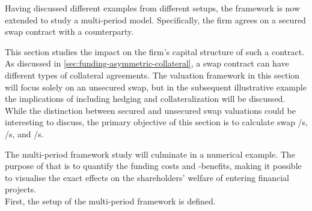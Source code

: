 \documentclass[main.tex]{subfiles}
\begin{document}
    Having discussed different examples from different setups,
    the framework is now extended to study a multi-period model.
    Specifically, the firm agrees on a secured swap contract with a counterparty.
    
    This section studies the impact on the firm's capital structure of such a contract.
    As discussed in \cref{sec:funding-asymmetric-collateral}, a swap contract can have different types of collateral agreements.
    The valuation framework in this section will focus solely on an unsecured swap,
    but in the subsequent illustrative example 
    the implications of including hedging and collateralization will be discussed.
    While the distinction between secured and unsecured swap valuations could be interesting to discuss,
    the primary objective of this section is to calculate swap \FVA/s, \CVA/s, and \DVA/s.

    The multi-period framework study will culminate in a numerical example.
    The purpose of that is to quantify the funding costs and -benefits,
    making it possible to visualise the exact effects on the shareholders' welfare of entering financial projects.
    \\
    First, the setup of the multi-period framework is defined.
\end{document}
